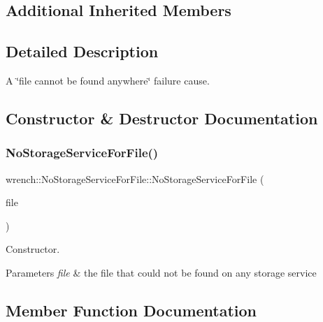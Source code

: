 \subsection*{Additional Inherited Members}


\subsection{Detailed Description}
A \char`\"{}file cannot be found anywhere\char`\"{} failure cause. 

\subsection{Constructor \& Destructor Documentation}
\mbox{\label{classwrench_1_1_no_storage_service_for_file_a0f82dcea16ae2d5bd47186002906e840}} 
\subsubsection{\texorpdfstring{No\+Storage\+Service\+For\+File()}{NoStorageServiceForFile()}}
{\footnotesize\ttfamily wrench\+::\+No\+Storage\+Service\+For\+File\+::\+No\+Storage\+Service\+For\+File (\begin{DoxyParamCaption}\item[{\hyperlink{classwrench_1_1_workflow_file}{Workflow\+File} $\ast$}]{file }\end{DoxyParamCaption})}



Constructor. 


\begin{DoxyParams}{Parameters}
{\em file} & the file that could not be found on any storage service \\
\hline
\end{DoxyParams}


\subsection{Member Function Documentation}
\mbox{\label{classwrench_1_1_no_storage_service_for_file_a0f9c9e16bac0150881b4303385b716a0}} 
